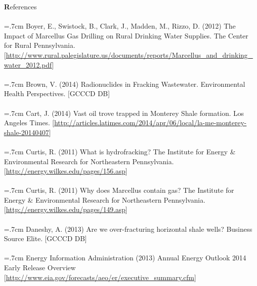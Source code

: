 \documentclass{article}
\begin{document}
\newpage
\begin{center}{\Large \textbf References}
\end{center}

  \paragraph{} \hangindent=.7cm Boyer, E., Swistock, B., Clark, J., Madden, M., Rizzo, D. (2012) The Impact of Marcellus Gas Drilling on Rural Drinking Water Supplies. The Center for Rural Pennsylvania. [\url{http://www.rural.palegislature.us/documents/reports/Marcellus_and_drinking_water_2012.pdf}]

  \paragraph{} \hangindent=.7cm Brown, V. (2014) Radionuclides in Fracking Wastewater. Environmental Health Perspectives. [GCCCD DB]

  \paragraph{} \hangindent=.7cm Cart, J. (2014) Vast oil trove trapped in Monterey Shale formation. Los Angeles Times. [\url{http://articles.latimes.com/2014/apr/06/local/la-me-monterey-shale-20140407}]

  \paragraph{} \hangindent=.7cm Curtis, R. (2011) What is hydrofracking? The Institute for Energy \& Environmental Research for Northeastern Pennsylvania.  [\url{http://energy.wilkes.edu/pages/156.asp}]

  \paragraph{} \hangindent=.7cm Curtis, R. (2011) Why does Marcellus contain gas? The Institute for Energy \& Environmental Research for Northeastern Pennsylvania. [\url{http://energy.wilkes.edu/pages/149.asp}]

  \paragraph{} \hangindent=.7cm Daneshy, A. (2013) Are we over-fracturing horizontal shale wells? Business Source Elite. [GCCCD DB]

  \paragraph{} \hangindent=.7cm Energy Information Administration (2013) Annual Energy Outlook 2014 Early Release Overview [\url{http://www.eia.gov/forecasts/aeo/er/executive_summary.cfm}]
\end{document}
